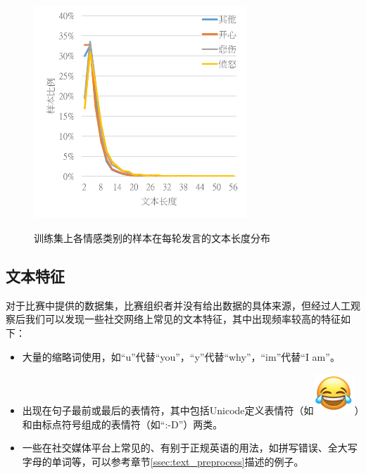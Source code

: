 \begin{figure}[h]
\begin{minipage}{\linewidth}
  \end{minipage}
  \vspace{0.5cm} 

      {\includegraphics[height=8cm]{img/semeval2019_task3_train_2_class_len.png}}

  \caption{训练集上各情感类别的样本在每轮发言的文本长度分布}

  \label{fig:context_emo_train_class_len}
\end{figure}

\subsection{文本特征}
\label{ssec:exp_context_emo_data_text}

对于比赛中提供的数据集，比赛组织者并没有给出数据的具体来源，但经过人工观察后我们可以发现一些社交网络上常见的文本特征，其中出现频率较高的特征如下：

\begin{itemize}

\item 大量的缩略词使用，如“u”代替“you”，“y”代替“why”，“im”代替“I am”。

\item 出现在句子最前或最后的表情符，其中包括Unicode定义表情符（如\includegraphics[height=1.5\fontcharht\font`\B]{img/emoji/lol.png}）和由标点符号组成的表情符（如“:-D”）两类。

\item 一些在社交媒体平台上常见的、有别于正规英语的用法，如拼写错误、全大写字母的单词等，可以参考章节\ref{ssec:text_preprocess}描述的例子。

\end{itemize}


